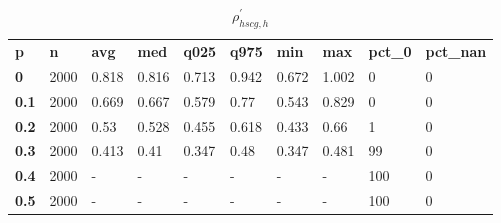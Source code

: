 \begin{table}[h]
 \centering 
\footnotesize
\caption{$\rho_{hscg,h}^\prime $}
\label{tab:alphahscgh}
\begin{tabular}[h]{| l l l l l l l l l l|
    } \hline
\textbf{ p} & \textbf{ n} & \textbf{ avg} & \textbf{ med} & \textbf{ q025} & \textbf{ q975} & \textbf{ min} & \textbf{ max} & \textbf{ pct\_0} & \textbf{ pct\_nan}
           \\
  \textbf{  0} & 2000 & 0.818 & 0.816 & 0.713 & 0.942 & 0.672 & 1.002 &   0 & 0
           \\
  \textbf{0.1} & 2000 & 0.669 & 0.667 & 0.579 &  0.77 & 0.543 & 0.829 &   0 & 0
           \\
  \textbf{0.2} & 2000 &  0.53 & 0.528 & 0.455 & 0.618 & 0.433 &  0.66 &   1 & 0
           \\
  \textbf{0.3} & 2000 & 0.413 &  0.41 & 0.347 &  0.48 & 0.347 & 0.481 &  99 & 0
           \\
  \textbf{0.4} & 2000 & - & - & - & - & - & - & 100 & 0
           \\
  \textbf{0.5} & 2000 & - & - & - & - & - & - & 100 & 0
           \\
 \hline \end{tabular}
 \end{table}
